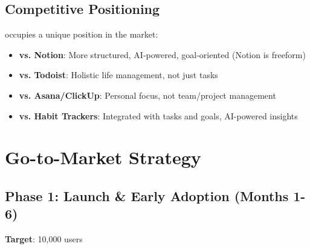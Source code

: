 \subsection{Competitive Positioning}

\lifeos{} occupies a unique position in the market:

\begin{itemize}
    \item \textbf{vs. Notion}: More structured, AI-powered, goal-oriented (Notion is freeform)
    \item \textbf{vs. Todoist}: Holistic life management, not just tasks
    \item \textbf{vs. Asana/ClickUp}: Personal focus, not team/project management
    \item \textbf{vs. Habit Trackers}: Integrated with tasks and goals, AI-powered insights
\end{itemize}

\section{Go-to-Market Strategy}

\subsection{Phase 1: Launch \& Early Adoption (Months 1-6)}

\textbf{Target}: 10,000 users

